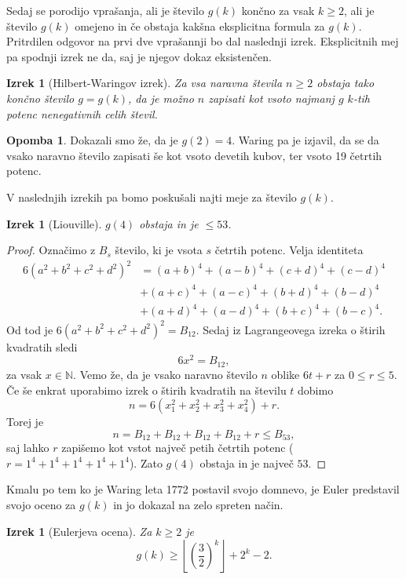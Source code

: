 \documentclass[a4paper]{amsart}
\newcommand{\NN}{\mathbb{N}}
\theoremstyle{definition}
\newtheorem{opomba}[definicija]{Opomba}
\theoremstyle{plain}
\newtheorem{izrek}[definicija]{Izrek}
\numberwithin{equation}{section}
\begin{document}
Sedaj se porodijo vprašanja, ali je število $g(k)$ končno za vsak $k\geqslant 2$,  ali je število $g(k)$ omejeno in če obstaja kakšna eksplicitna formula za $g(k)$. Pritrdilen odgovor na prvi dve vprašannji bo dal naslednji izrek. Eksplicitnih mej pa spodnji izrek ne da, saj je njegov dokaz eksistenčen.

\begin{izrek}[Hilbert-Waringov izrek]
	Za vsa naravna števila $n\geqslant 2$ obstaja tako končno število $g=g(k)$, da je možno $n$ zapisati kot vsoto najmanj $g$ $k$-tih potenc nenegativnih celih števil.
\end{izrek}

\begin{opomba}
	Dokazali smo že, da je $g(2)=4$. Waring pa je izjavil, da se da vsako naravno število zapisati še kot vsoto devetih kubov, ter vsoto 19 četrtih potenc.
\end{opomba}

V naslednjih izrekih pa bomo poskušali najti meje za število $g(k)$.


\begin{izrek}[Liouville]
	$g(4)$ obstaja in je $\leqslant 53$.
\end{izrek}
\begin{proof}
	Označimo z $B_s$ število, ki je vsota $s$ četrtih potenc. Velja identiteta 
	\begin{align*}
		 6(a^2+b^2+c^2+d^2)^2 &= (a+b)^4 + (a-b)^4+(c+d)^4 + (c-d)^4\\ &+ (a+c)^4 + (a-c)^4 + (b+d)^4 + (b-d)^4 \\ &+ (a+d)^4 + (a-d)^4 + (b+c)^4 + (b-c)^4.
	\end{align*}
	Od tod je $6(a^2+b^2+c^2+d^2)^2 = B_{12}$. Sedaj iz Lagrangeovega izreka o štirih kvadratih sledi $$6x^2=B_{12},$$ za vsak $x\in\NN.$ Vemo že, da je vsako naravno število $n$ oblike $6t+r$ za $0\leqslant r \leqslant 5.$ Če še enkrat uporabimo izrek o štirih kvadratih na številu $t$ dobimo $$n=6(x_1^2+x_2^2+x_3^2+x_4^2)+r.$$
	Torej je $$n=B_{12}+B_{12}+B_{12}+B_{12}+r 
	\leqslant 
	 B_{53},$$
	saj lahko $r$ zapišemo kot vstot največ petih četrtih potenc ($r=1^4+1^4+1^4+1^4+1^4$). Zato $g(4)$ obstaja in je največ $53$.
\end{proof}

Kmalu po tem ko je Waring leta 1772 postavil svojo domnevo, je Euler predstavil svojo oceno za $g(k)$ in jo dokazal na zelo spreten način.

\begin{izrek}[Eulerjeva ocena]
	Za $k\geqslant 2$ je $$g(k) \geqslant \left\lfloor \left(\frac{3}{2}\right)^k \right\rfloor + 2^k -2.$$
\end{izrek}
\end{document}
